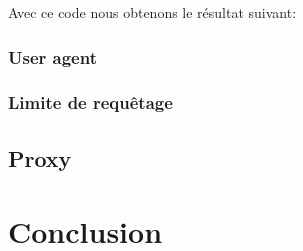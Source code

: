 \documentclass[hideweeklyreports,noposter]{polytech/polytech}
\begin{document}
		
		Avec ce code nous obtenons le résultat suivant:
		
		\section{User agent}
		\section{Limite de requêtage}
	
	\chapter{Proxy}
		

\part{Conclusion}

\appendix		
\end{document}
